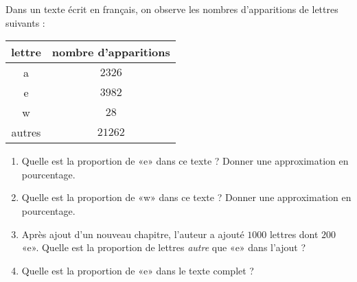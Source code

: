 
\begin{exercice}\label{exo2smath-0312}

    Dans un texte écrit en français, on observe les nombres d'apparitions de lettres suivants :
    \begin{center}
    \begin{tabular}[]{|c||c|}
        \hline
        lettre&nombre d'apparitions\\
        \hline\hline
        a&$2326$\\
        \hline
        e&$3982$\\
        \hline
        w&$28$\\
        \hline
        autres&$21262$\\
        \hline
    \end{tabular}
    \end{center}
    \begin{enumerate}
        \item
            Quelle est la proportion de «e» dans ce texte ? Donner une approximation en pourcentage.
        \item
            Quelle est la proportion de «w» dans ce texte ? Donner une approximation en pourcentage.
        \item
            Après ajout d'un nouveau chapitre, l'auteur a ajouté \( 1000\) lettres dont \( 200\) «e». Quelle est la proportion de lettres \emph{autre} que «e»  dans l'ajout ?
        \item
            Quelle est la proportion de «e» dans le texte complet ?
    \end{enumerate}


\end{exercice}
